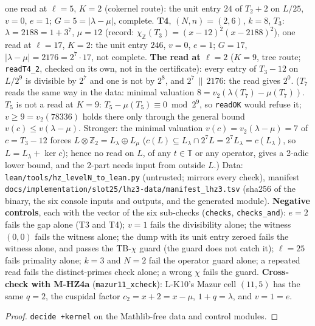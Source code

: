 \begin{theorem}
  one read at $\ell=5$, $K=2$ (cokernel route): the unit entry $24$ of $T_2+2$ on $L/25$, $v=0$, $e=1$; $G=5=|\lambda-\mu|$, complete.
  \textbf{T4}, $(N,n)=(2,6)$, $k=8$, $T_3$: $\lambda=2188=1+3^7$, $\mu=12$ (record: $\chi_{\mathbb Z}(T_3)=(x-12)^2(x-2188)^2$), one read at
  $\ell=17$, $K=2$: the unit entry $246$, $v=0$, $e=1$; $G=17$, $|\lambda-\mu|=2176=2^7\cdot17$, not complete. \textbf{The read at $\ell=2$}
  ($K=9$, tree route; \texttt{readT4\_2}, checked on its own, not in the certificate): every entry of $T_3-12$ on $L/2^9$ is divisible by $2^7$
  and one is not by $2^8$, and $2^7\,\|\,2176$: the read gives $2^0$. ($T_7$ reads the same way in the data: minimal valuation $8=v_2(\lambda(T_7)-\mu(T_7))$. $T_5$ is not a read at $K=9$:
  $T_5-\mu(T_5)\equiv0\bmod2^9$, so \texttt{readOK} would refuse it; $v\ge9=v_2(78336)$ holds there only through the general bound
  $v(c)\le v(\lambda-\mu)$. Stronger: the minimal valuation $v(c)=v_2(\lambda-\mu)=7$ of $c=T_3-12$ forces $L\otimes\mathbb Z_2=L_\lambda\oplus L_\mu$
  ($c(L)\subseteq L_\lambda\cap2^7L=2^7L_\lambda=c(L_\lambda)$, so $L=L_\lambda+\ker c$); hence no read on $L$, of any $t\in\mathbb T$ or any operator,
  gives a 2-adic lower bound, and the 2-part needs input from outside $L$.) Data: \texttt{lean/tools/hz\_levelN\_to\_lean.py} (untrusted; mirrors every check), manifest
  \texttt{docs/implementation/slot25/lhz3-data/manifest\_lhz3.tsv} (sha256 of the binary, the six console inputs and outputs, and the
  generated module). \textbf{Negative controls}, each with the vector of the six sub-checks (\texttt{checks}, \texttt{checks\_and}): $e=2$ fails
  the gap alone (T3 and T4); $v=1$ fails the divisibility alone; the witness $(0,0)$ fails the witness alone; the dump with its unit entry
  zeroed fails the witness alone, and passes the TB-$\chi$ guard (the guard does not catch it); $\ell=25$ fails primality alone; $k=3$ and
  $N=2$ fail the operator guard alone; a repeated read fails the distinct-primes check alone; a wrong $\chi$ fails the guard.
  \textbf{Cross-check with M-HZ4a} (\texttt{mazur11\_xcheck}): L-K10's Mazur cell $(11,5)$ has the same $q=2$, the cuspidal factor
  $c_2=x+2=x-\mu$, $1+q=\lambda$, and $v=1=e$.
\end{theorem}
\begin{proof}
  \leanok
  \texttt{decide +kernel} on the Mathlib-free data and control modules.
\end{proof}

